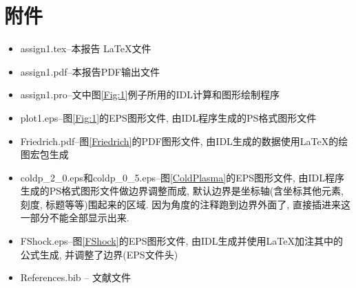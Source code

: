 \documentclass{article}
\begin{document}
	\section{附件}
	
	\begin{itemize}
		\item
		assign1.tex--本报告 \LaTeX 文件
		\item
		assign1.pdf--本报告PDF输出文件
		\item
		assign1.pro--文中图\ref{Fig:1}例子所用的IDL计算和图形绘制程序
		\item
		plot1.eps--图\ref{Fig:1}的EPS图形文件, 由IDL程序生成的PS格式图形文件
		\item
		Friedrich.pdf--图\ref{Friedrich}的PDF图形文件, 由IDL生成的数据使用\LaTeX 的绘图宏包生成
		\item
		coldp\_2\_0.eps和coldp\_0\_5.eps--图\ref{ColdPlasma}的EPS图形文件, 由IDL程序生成的PS格式图形文件做边界调整而成, 默认边界是坐标轴(含坐标其他元素, 刻度, 标题等等)围起来的区域. 因为角度的注释跑到边界外面了, 直接插进来这一部分不能全部显示出来.
		\item
		FShock.eps--图\ref{FShock}的EPS图形文件, 由IDL生成并使用\LaTeX 加注其中的公式生成, 并调整了边界(EPS文件头)
		\item
		References.bib -- 文献文件
	\end{itemize}

	
	
	
	
\end{document}
